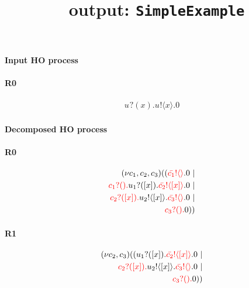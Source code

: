 \documentclass{article}
\title{\misty \ output: \texttt{SimpleExample}}
\begin{document}
\maketitle
\paragraph{Input HO process}

\paragraph{R0}
\begin{align*}
u_{}?(x).u_{}! \langle  x \rangle.0 
\end{align*}

\paragraph{Decomposed HO process}\paragraph{R0}
\begin{align*}
 (\nu c_{1},c_{2},c_{3})((\color{red}\bar{c_{1}}! \langle  \rangle \color{black}.0  \ | \\ \color{red}c_{1}?().\color{black}\color{black}u_{1}?([x]).\color{black}\color{red}\bar{c_{2}}! \langle [x] \rangle \color{black}.0  \ | \\ \color{red}c_{2}?([x]).\color{black}\color{black}u_{2}! \langle [x] \rangle \color{black}.\color{red}\bar{c_{3}}! \langle  \rangle \color{black}.0  \ | \\ \color{red}c_{3}?().\color{black}0 ))
\end{align*}
\paragraph{R1}
\begin{align*}
 (\nu c_{2},c_{3})((\color{black}u_{1}?([x]).\color{black}\color{red}\bar{c_{2}}! \langle [x] \rangle \color{black}.0  \ | \\ \color{red}c_{2}?([x]).\color{black}\color{black}u_{2}! \langle [x] \rangle \color{black}.\color{red}\bar{c_{3}}! \langle  \rangle \color{black}.0  \ | \\ \color{red}c_{3}?().\color{black}0 ))
\end{align*}
\end{document}
